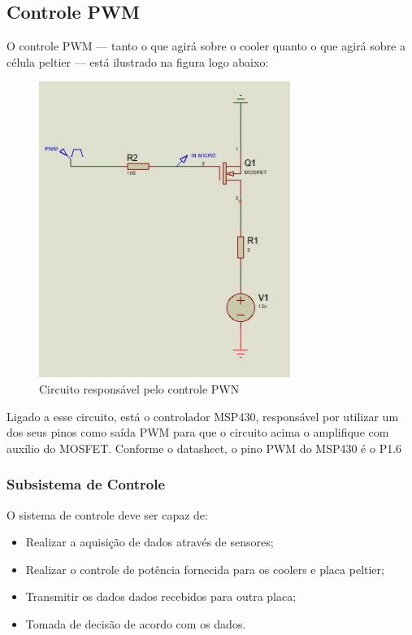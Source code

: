 \subsection{Controle PWM}
 O controle PWM --- tanto o que agirá sobre o cooler quanto o que agirá sobre a célula peltier --- está ilustrado na figura logo abaixo:
 \begin{figure}[H]
 	\begin{center}
 		\includegraphics[scale = 0.65]{figuras/Controle_PWM.JPG}
 		\caption{Circuito responsável pelo controle PWN}
 	\end{center}
 \end{figure}
 
	 Ligado a esse circuito, está o controlador MSP430, responsável por utilizar um dos seus pinos como saída PWM para que o circuito acima o amplifique com auxílio do MOSFET. Conforme o datasheet, o pino PWM do MSP430 é o P1.6
\subsubsection{Subsistema de Controle}
O sistema de controle deve ser capaz de:
\begin{itemize}
	\item Realizar a aquisição de dados através de sensores;
	\item Realizar o controle de potência fornecida para os coolers e placa peltier;
	\item Transmitir os dados dados recebidos para outra placa;
	\item Tomada de decisão de acordo com os dados.
\end{itemize}

